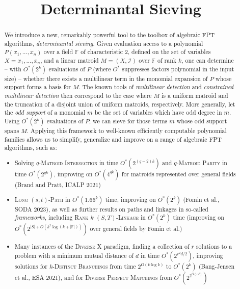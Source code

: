 \documentclass{theoretics}
\title{Determinantal Sieving}
\newcommand{\F}{\ensuremath{\mathbb F}\xspace}
\newcommand{\cI}{\ensuremath{\mathcal I}\xspace}
\newcommand{\Oh}{O}
\begin{document}
\maketitle

\begin{abstract}
  We introduce a new, remarkably powerful tool to the toolbox of
  algebraic FPT algorithms, \emph{determinantal sieving}.
  Given evaluation access to a polynomial $P(x_1,\ldots,x_n)$ over a field $\F$ of characteristic 2, defined on the set of variables $X={x_1,\ldots,x_n}$, and a linear matroid $M=(X,\cI)$ over $\F$ of rank $k$, one can determine -- with $O^*(2^k)$ evaluations of $P$ (where $O^*$ suppresses factors polynomial in the input size) -- whether there exists a multilinear term in the monomial expansion of $P$ whose support forms a basis for $M$.
   The known tools of \emph{multilinear
    detection} and \emph{constrained multilinear detection} then
  correspond to the case where $M$ is a uniform matroid and 
 the truncation of a disjoint union of uniform matroids, respectively. 
  More generally, let the \emph{odd support} of a monomial $m$ be the
  set of variables which have odd degree in $m$. Using $O^*(2^k)$
  evaluations of $P$, we can sieve for those terms $m$ whose odd
  support spans $M$. Applying this framework to well-known efficiently
  computable polynomial families allows us to simplify, generalize and
  improve on a range of algebraic FPT algorithms, such as:
  \begin{itemize}
  \item Solving \textsc{$q$-Matroid Intersection} in time $O^*(2^{(q-2)k})$
    and \textsc{$q$-Matroid Parity} in time $O^*(2^{qk})$,
    improving on $O^*(4^{qk})$ for matroids represented over general
    fields (Brand and Pratt, ICALP 2021) 
  \item \textsc{Long $(s, t)$-Path} in $O^*(1.66^k)$ time,
    improving on $O^*(2^k)$ (Fomin et al., SODA 2023),
    as well as further results on paths and linkages in so-called \emph{frameworks},
    including \textsc{Rank $k$ $(S,T)$-Linkage}
    in $O^*(2^k)$ time (improving on $O^*(2^{|S|+\Oh(k^2 \log (k+|\F|))})$
    over general fields by Fomin et al.)
  \item Many instances of the \textsc{Diverse X} paradigm, finding
    a collection of $r$ solutions to a problem with a minimum
    mutual distance of $d$ in time $O^*(2^{r^2 d/2})$, improving solutions for
    \textsc{$k$-Distinct Branchings} 
    from time $2^{O(k \log k)}$ to $O^*(2^k)$ (Bang-Jensen et al., ESA 2021),
    and for \textsc{Diverse Perfect Matchings} from $O^*(2^{2^{O(rd)}})$

\end{itemize}
\end{abstract}
\end{document}
